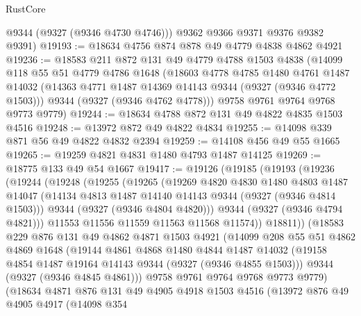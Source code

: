 \begin{lexlean}{RustCore}
\begin{coremodule}
        @9344
        (@9327 (@9346 @4730 @4746)))
      @9362
      @9366
      @9371
      @9376
      @9382
      @9391)
@19193 := @18634 @4756 @874 @878 @49 @4779 @4838 @4862 @4921
@19236 := @18583
    @211
    @872
    @131
    @49
    @4779
    @4788
    @1503
    @4838
    (@14099
      @118
      @55
      @51
      @4779
      @4786
      @1648
      (@18603
        @4778
        @4785
        @1480
        @4761
        @1487
        @14032
        (@14363 @4771 @1487 @14369 @14143 @9344 (@9327 (@9346 @4772 @1503)))
        @9344
        (@9327 (@9346 @4762 @4778)))
      @9758
      @9761
      @9764
      @9768
      @9773
      @9779)
@19244 := @18634 @4788 @872 @131 @49 @4822 @4835 @1503 @4516
@19248 := @13972 @872 @49 @4822 @4834
@19255 := @14098 @339 @871 @56 @49 @4822 @4832 @2394
@19259 := @14108 @456 @49 @55 @1665
@19265 := @19259 @4821 @4831 @1480 @4793 @1487 @14125
@19269 := @18775 @133 @49 @54 @1667
@19417 := @19126
    (@19185
      (@19193
        (@19236
          (@19244
            (@19248
              (@19255
                (@19265
                  (@19269
                    @4820
                    @4830
                    @1480
                    @4803
                    @1487
                    @14047
                    (@14134 @4813 @1487 @14140 @14143 @9344 (@9327 (@9346 @4814 @1503)))
                    @9344
                    (@9327 (@9346 @4804 @4820)))
                  @9344
                  (@9327 (@9346 @4794 @4821)))
                @11553
                @11556
                @11559
                @11563
                @11568
                @11574))
            @18811))
        (@18583
          @229
          @876
          @131
          @49
          @4862
          @4871
          @1503
          @4921
          (@14099
            @208
            @55
            @51
            @4862
            @4869
            @1648
            (@19144
              @4861
              @4868
              @1480
              @4844
              @1487
              @14032
              (@19158 @4854 @1487 @19164 @14143 @9344 (@9327 (@9346 @4855 @1503)))
              @9344
              (@9327 (@9346 @4845 @4861)))
            @9758
            @9761
            @9764
            @9768
            @9773
            @9779)
          (@18634
            @4871
            @876
            @131
            @49
            @4905
            @4918
            @1503
            @4516
            (@13972
              @876
              @49
              @4905
              @4917
              (@14098
                @354

\end{coremodule}
\end{lexlean}
